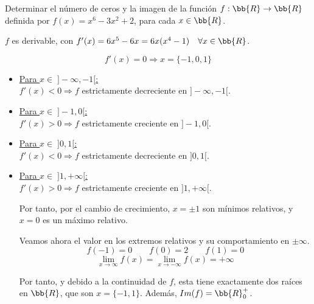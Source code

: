 \begin{ejercicio}
    Determinar el número de ceros y la imagen de la función $f:\bb{R} \to \bb{R}$ definida por $f(x)=x^6-3x^2+2$, para cada $x\in \bb{R}$.

    $f$ es derivable, con $f'(x)=6x^5-6x = 6x(x^4-1) \quad \forall x\in \bb{R}$.

    $$f'(x)=0 \Longrightarrow x=\{-1,0,1\}$$
    \begin{itemize}
        \item \underline{Para $x \in \;]-\infty, -1[$:}\\
        $f'(x)<0 \Longrightarrow f$ estrictamente decreciente en $]-\infty, -1[$.

        \item \underline{Para $x \in \;]-1, 0[$:}\\
        $f'(x)>0 \Longrightarrow f$ estrictamente creciente en $]-1, 0[$.

        \item \underline{Para $x \in \;]0, 1[$:}\\
        $f'(x)<0 \Longrightarrow f$ estrictamente decreciente en $]0, 1[$.

        \item \underline{Para $x \in \;]1, +\infty[$:}\\
        $f'(x)>0 \Longrightarrow f$ estrictamente creciente en $]1, +\infty[$.

        Por tanto, por el cambio de crecimiento, $x=\pm 1$ son mínimos relativos, y $x=0$ es un máximo relativo.

        Veamos ahora el valor en los extremos relativos y su comportamiento en $\pm \infty$.
        $$f(-1)=0 \qquad f(0)=2 \qquad f(1)=0$$
        \begin{equation*}
            \lim_{x\to\infty}f(x) =\lim_{x\to-\infty}f(x) = +\infty
        \end{equation*}

        Por tanto, y debido a la continuidad de $f$, esta tiene exactamente dos raíces en $\bb{R}$, que son $x=\{-1,1\}$. Además, $Im(f)=\bb{R}^+_0$.
        
    \end{itemize}
\end{ejercicio}

